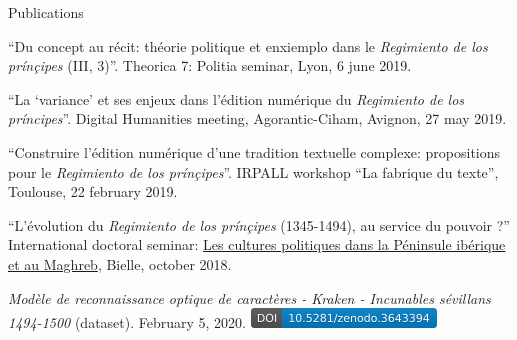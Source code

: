 \begin{rubric}{Publications}
                    
                
                    
                    \entry*
                
                    
                    \entry*
                
                    
                    \entry*
                
                    
                    \entry*
                
                    
                    \entry*
                \enquote{Du concept au récit: théorie politique et
                                enxiemplo dans le \textit{Regimiento de los
                                prínçipes} (III, 3)}. Theorica 7:
                        Politia seminar, Lyon, 6 june 2019.
                    
                    \entry*
                \enquote{La \enquote{variance} et ses enjeux dans
                            l'édition numérique du \textit{Regimiento de los
                                príncipes}}. Digital Humanities
                        meeting, Agorantic-Ciham, Avignon, 27 may
                        2019.
                    
                    \entry*
                \enquote{Construire l'édition numérique d'une
                            tradition textuelle complexe: propositions pour le
                                \textit{Regimiento de los prínçipes}}.
                        IRPALL workshop \enquote{La fabrique du texte},
                            Toulouse, 22 february 2019.
                    
                    \entry*
                \enquote{L'évolution du \textit{Regimiento de los
                                prínçipes} (1345-1494), au service du
                            pouvoir ?} International doctoral seminar:
                            \href{https://recherche.univ-pau.fr/fr/accueil/cpim.html}{Les cultures politiques dans la Péninsule ibérique
                            et au Maghreb}, Bielle, october
                        2018. 
            
                    
                    \entry*
                
                    
                    \entry*
                
                    
                    \entry*
                
                    
                    \entry*
                \textit{Modèle de reconnaissance optique de
                            caractères - Kraken - Incunables sévillans
                            1494-1500} (dataset). February 5, 2020. \href{https://zenodo.org/record/3643393}{\includegraphics[scale=0.75]{img/kraken_doi.png}}\end{rubric}


